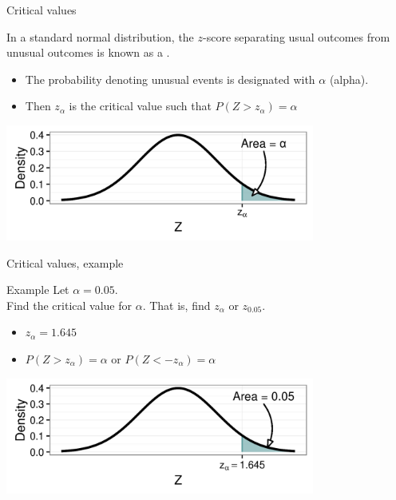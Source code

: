 \documentclass[xcolor=table]{beamer}
\begin{document}
\begin{frame}{Critical values}
\begin{block}{}
{\large In a standard normal distribution, the $z$-score separating usual outcomes from unusual outcomes is known as a .}
\begin{itemize}
\item The probability denoting unusual events is designated with $\alpha$ (alpha).
\item Then $z_\alpha$ is the critical value such that $P(Z > z_\alpha) = \alpha$
\end{itemize}
\end{block}

\medskip
{\centering
\includegraphics[width=4in]{../images/ch6_alpha}
\par}

\end{frame}

\begin{frame}{Critical values, example}
\begin{exampleblock}{Example}
Let $\alpha = 0.05$.\\
\medskip
Find the critical value for $\alpha$. That is, find $z_\alpha$ or $z_{0.05}$.
\begin{itemize}
\pause\item $z_\alpha = 1.645$
\item $P(Z > z_\alpha) = \alpha$ or $P(Z < -z_\alpha) = \alpha$
\end{itemize}
\end{exampleblock}
\smallskip
{\centering
\includegraphics[width=4in]{../images/ch6_crit1}
\par}

\end{frame}
\end{document}
